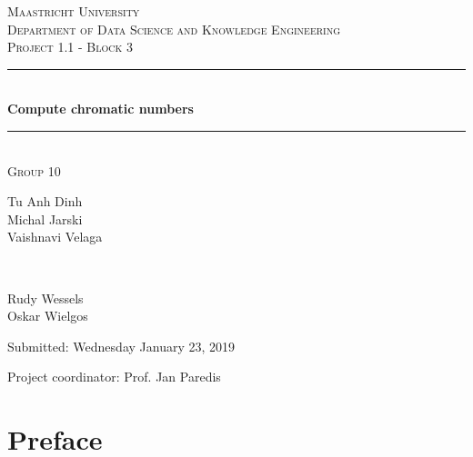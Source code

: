 \documentclass[a4paper]{report}
\begin{document}
	\begin{titlepage} 
		\newcommand{\HRule}{\rule{\linewidth}{0.5mm}} 
		
		\center
		
		\textsc{\LARGE Maastricht University}\\[1.5cm]
		
		\textsc{\Large Department of Data Science and Knowledge Engineering}\\[0.5cm] 
		
		\textsc{\large Project 1.1 - Block 3}\\[0.5cm] 
		
		\HRule\\[0.4cm]
		
		{\huge\bfseries Compute chromatic numbers}\\[0.4cm] 
		
		\HRule\\[1.5cm]
		
		\textsc{\large Group 10}\\[0.5cm]
		
		\begin{minipage}{0.6\textwidth}
			\begin{flushleft}
				Tu Anh Dinh\\Michal Jarski\\Vaishnavi Velaga
			\end{flushleft}
		\end{minipage}
		~
		\begin{minipage}{0.3\textwidth}
			\begin{flushleft}
				Rudy Wessels\\Oskar Wielgos\\
			\end{flushleft}
		\end{minipage}
	
		 \vspace{1cm}
		Submitted: Wednesday January 23, 2019
		\vspace{3cm}
		\begin{flushleft}
			Project coordinator: Prof. Jan Paredis
		\end{flushleft}
		
	\end{titlepage}
	
	\chapter*{Preface}
\end{document}
